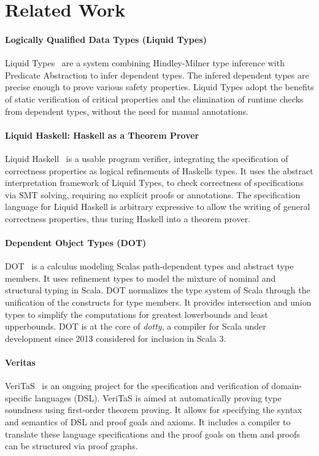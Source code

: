 \chapter{Related Work}
\label{chp:related}

\subsubsection{Logically Qualified Data Types (Liquid Types)}
Liquid Types~\cite{liquid-types} are a system
combining Hindley-Milner type inference with Predicate Abstraction
to infer dependent types.
The infered dependent types are precise enough
to prove various safety properties.
Liquid Types adopt the benefits of
static verification of critical properties and
the elimination of runtime checks
from dependent types,
without the need for manual annotations.

\subsubsection{Liquid Haskell: Haskell as a Theorem Prover}
Liquid Haskell~\cite{liquid-haskell} is a usable
program verifier, integrating
the specification of correctness properties
as logical refinements of Haskells types.
It uses the abstract interpretation framework of Liquid Types,
to check correctness of specifications via SMT solving,
requiring no explicit proofs or annotations.
The specification language for Liquid Haskell
is arbitrary expressive to allow
the writing of general correctness properties,
thus turing Haskell into a theorem prover.

\subsubsection{Dependent Object Types (DOT)}
DOT~\cite{dot1,dot2} is a calculus
modeling Scalas path-dependent types and abstract type members.
It uses refinement types to model the mixture of
nominal and structural typing in Scala.
DOT normalizes the type system of Scala
through the unification of the constructs for type members.
It provides intersection and union types
to simplify the computations for greatest lowerbounds
and least upperbounds.
DOT is at the core of \textit{dotty},
a compiler for Scala under development since 2013
considered for inclusion in Scala 3.

\subsubsection{Veritas}
VeriTaS~\cite{veritas1,veritas2} is an ongoing project
for the specification and verification
of domain-specific languages (DSL).
VeriTaS is aimed at automatically proving type soundness 
using first-order theorem proving.
It allows for specifying
the syntax and semantics of DSL
and proof goals and axioms.
It includes a compiler to translate
these language specifications and the proof goals on them
and proofs can be structured via proof graphs.


